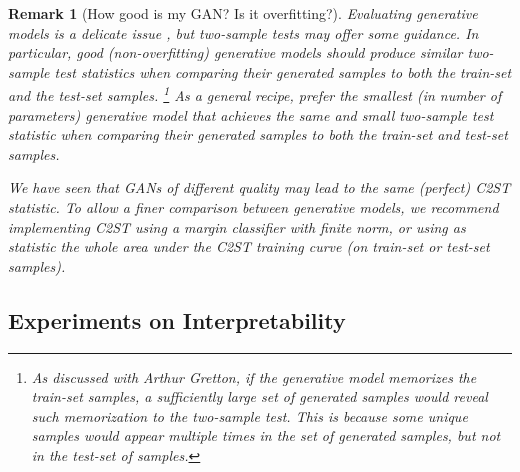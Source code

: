 \documentclass[a4paper]{article}
\newtheorem{remark}{Remark}
\begin{document}
  \begin{remark}[How good is my GAN? Is it overfitting?]
  Evaluating generative models is a delicate issue \citep{theis2015note},
  but two-sample tests may offer some guidance.
  In particular, good (non-overfitting) generative models should produce similar two-sample test
  statistics when comparing their generated samples to both the train-set and the test-set samples.
  \footnote{As discussed with
  Arthur Gretton, if the generative model memorizes the train-set samples, a sufficiently
  large set of generated samples would reveal such memorization to the two-sample test. This
  is because some unique samples would appear multiple times in the set of generated samples,
  but not in the test-set of samples.}
  As a general recipe, prefer \emph{the smallest} (in number of parameters) generative model that achieves the \emph{same and small} two-sample
  test statistic when comparing their generated samples to both the train-set and test-set samples.
  
  We have seen that GANs of different quality may lead to the same
  (perfect) C2ST statistic.  To allow a finer comparison between generative
  models, we recommend implementing C2ST using a margin classifier with
  finite norm, or using as statistic the whole area under the C2ST
  training curve (on train-set or test-set samples).
  \end{remark}

  \subsection{Experiments on Interpretability}
\end{document}
